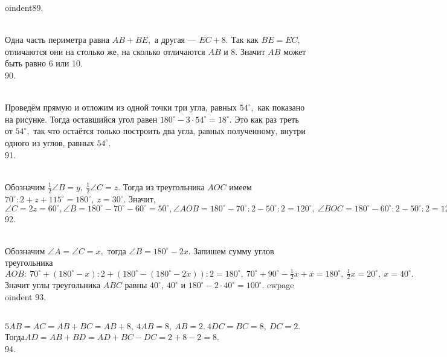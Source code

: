 oindent89. \begin{figure}[ht!]
\end{figure}\\
Одна часть периметра равна $AB+BE,$ а другая --- $EC+8.$ Так как $BE=EC,$ отличаются они на столько же, на сколько отличаются $AB$ и 8. Значит $AB$ может быть равно 6 или 10.\\
90. \begin{figure}[ht!]
\end{figure}\\Проведём прямую и отложим из одной точки три угла, равных $54^\circ,$ как показано на рисунке. Тогда оставшийся угол равен $180^\circ-3\cdot54^\circ=18^\circ.$ Это как раз треть от $54^\circ,$ так что остаётся только построить два угла, равных полученному, внутри одного из углов, равных $54^\circ.$\\
91. \begin{figure}[ht!]
\end{figure}\\
Обозначим $\frac{1}{2}\angle B=y,\ \frac{1}{2}\angle C=z.$ Тогда из треугольника $AOC$ имеем $70^\circ:2+z+115^\circ=180^\circ,\ z=30^\circ.$ Значит, $\angle C=2z=60^\circ, \angle B=180^\circ-70^\circ-60^\circ=50^\circ, \angle AOB=180^\circ-70^\circ:2-50^\circ:2=120^\circ,\ \angle BOC=180^\circ-60^\circ:2-50^\circ:2=125^\circ.$\\
92. \begin{figure}[ht!]
\end{figure}\\
Обозначим $\angle A=\angle C=x,$ тогда $\angle B=180^\circ-2x.$ Запишем сумму углов треугольника $AOB:\ 70^\circ+(180^\circ-x):2+(180^\circ-(180^\circ-2x)):2=180^\circ,\ 70^\circ +90^\circ-\frac{1}{2}x+x=180^\circ,\ \frac{1}{2}x=20^\circ,\ x=40^\circ.$ Значит углы треугольника $ABC$ равны $40^\circ,\ 40^\circ$ и $180^\circ-2\cdot40^\circ=100^\circ.$
ewpage
oindent
93. \begin{figure}[ht!]
\end{figure}\\
$5AB=AC=AB+BC=AB+8,\ 4AB=8,\ AB=2.\ 4DC=BC=8,\ DC=2.$ Тогда$AD=AB+BD=AD+BC-DC=2+8-2=8.$\\
94. \begin{figure}[ht!]
\end{figure}\\
